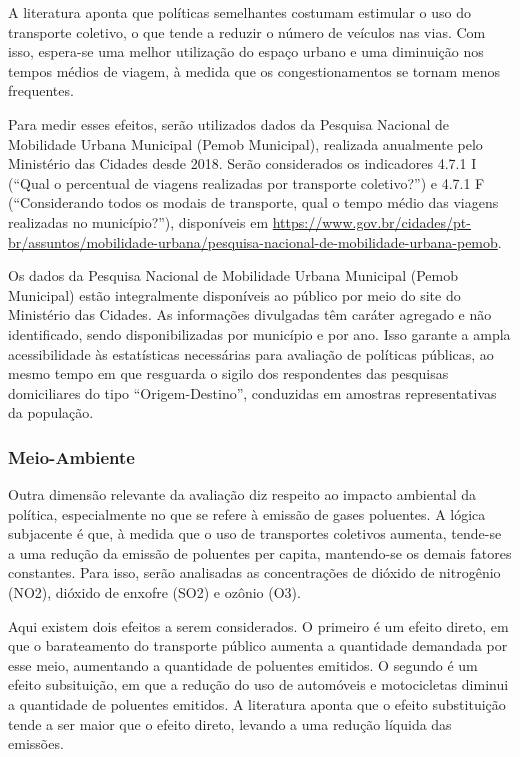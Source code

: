 A literatura aponta que políticas semelhantes costumam estimular o uso do transporte coletivo, o que tende a reduzir o número de veículos nas vias. Com isso, espera-se uma melhor utilização do espaço urbano e uma diminuição nos tempos médios de viagem, à medida que os congestionamentos se tornam menos frequentes.

Para medir esses efeitos, serão utilizados dados da Pesquisa Nacional de Mobilidade Urbana Municipal (Pemob Municipal), realizada anualmente pelo Ministério das Cidades desde 2018. Serão considerados os indicadores 4.7.1 I (“Qual o percentual de viagens realizadas por transporte coletivo?”) e 4.7.1 F (“Considerando todos os modais de transporte, qual o tempo médio das viagens realizadas no município?”), disponíveis em \url{https://www.gov.br/cidades/pt-br/assuntos/mobilidade-urbana/pesquisa-nacional-de-mobilidade-urbana-pemob}.

Os dados da Pesquisa Nacional de Mobilidade Urbana Municipal (Pemob Municipal) estão integralmente disponíveis ao público por meio do site do Ministério das Cidades. As informações divulgadas têm caráter agregado e não identificado, sendo disponibilizadas por município e por ano. Isso garante a ampla acessibilidade às estatísticas necessárias para avaliação de políticas públicas, ao mesmo tempo em que resguarda o sigilo dos respondentes das pesquisas domiciliares do tipo “Origem-Destino”, conduzidas em amostras representativas da população.

\subsubsection{Meio-Ambiente}
Outra dimensão relevante da avaliação diz respeito ao impacto ambiental da política, especialmente no que se refere à emissão de gases poluentes. A lógica subjacente é que, à medida que o uso de transportes coletivos aumenta, tende-se a uma redução da emissão de poluentes per capita, mantendo-se os demais fatores constantes. Para isso, serão analisadas as concentrações de dióxido de nitrogênio (NO2), dióxido de enxofre (SO2) e ozônio (O3).

Aqui existem dois efeitos a serem considerados. O primeiro é um efeito direto, em que o barateamento do transporte público aumenta a quantidade demandada por esse meio, aumentando a quantidade de poluentes emitidos. O segundo é um efeito subsituição, em que a redução do uso de automóveis e motocicletas diminui a quantidade de poluentes emitidos. A literatura aponta que o efeito substituição tende a ser maior que o efeito direto, levando a uma redução líquida das emissões. 


